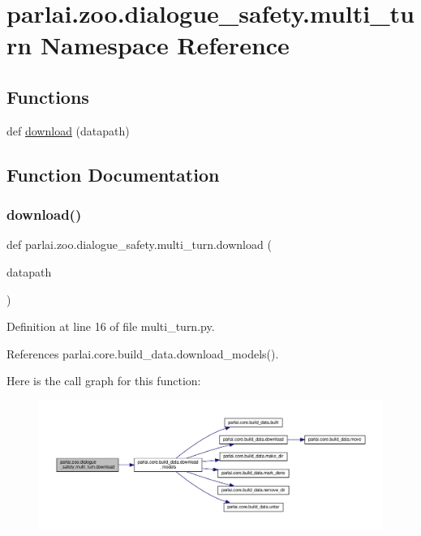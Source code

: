 \hypertarget{namespaceparlai_1_1zoo_1_1dialogue__safety_1_1multi__turn}{}\section{parlai.\+zoo.\+dialogue\+\_\+safety.\+multi\+\_\+turn Namespace Reference}
\label{namespaceparlai_1_1zoo_1_1dialogue__safety_1_1multi__turn}
\subsection*{Functions}
\begin{DoxyCompactItemize}
\item 
def \hyperlink{namespaceparlai_1_1zoo_1_1dialogue__safety_1_1multi__turn_ae081830ac93e63d15483d78b7417cf45}{download} (datapath)
\end{DoxyCompactItemize}


\subsection{Function Documentation}
\mbox{\label{namespaceparlai_1_1zoo_1_1dialogue__safety_1_1multi__turn_ae081830ac93e63d15483d78b7417cf45}} 
\subsubsection{\texorpdfstring{download()}{download()}}
{\footnotesize\ttfamily def parlai.\+zoo.\+dialogue\+\_\+safety.\+multi\+\_\+turn.\+download (\begin{DoxyParamCaption}\item[{}]{datapath }\end{DoxyParamCaption})}



Definition at line 16 of file multi\+\_\+turn.\+py.



References parlai.\+core.\+build\+\_\+data.\+download\+\_\+models().

Here is the call graph for this function\+:
\nopagebreak
\begin{figure}[H]
\begin{center}
\leavevmode
\includegraphics[width=350pt]{namespaceparlai_1_1zoo_1_1dialogue__safety_1_1multi__turn_ae081830ac93e63d15483d78b7417cf45_cgraph}
\end{center}
\end{figure}
